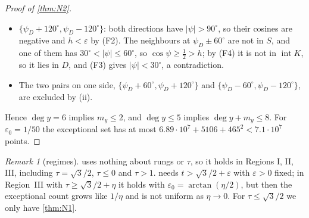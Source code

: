 \documentclass[11pt]{amsart}
\theoremstyle{definition}
\theoremstyle{remark}
\newtheorem{remark}[theorem]{Remark}
\newcommand{\eps}{\varepsilon}
\begin{document}
\begin{proof}[Proof of \cref{thm:N2}]
\begin{enumerate}[label=(\roman*),leftmargin=2em,resume]
\begin{itemize}[leftmargin=1.5em]
\item $\{\psi_D+120^\circ,\psi_D-120^\circ\}$: both directions have $|\psi|>90^\circ$, so their cosines are negative and $h<\eps$ by (F2). The neighbours at $\psi_D\pm60^\circ$ are not in $S$, and one of them has $30^\circ<|\psi|\le60^\circ$, so $\cos\psi\ge\frac12>h$; by (F4) it is not in $\operatorname{int}K$, so it lies in $D$, and (F3) gives $|\psi|<30^\circ$, a contradiction.
\item The two pairs on one side, $\{\psi_D+60^\circ,\psi_D+120^\circ\}$ and $\{\psi_D-60^\circ,\psi_D-120^\circ\}$, are excluded by (ii).
\end{itemize}
\end{enumerate}
Hence $\deg y=6$ implies $m_y\le2$, and $\deg y\le5$ implies $\deg y+m_y\le8$. For $\eps_0=1/50$ the exceptional set has at most $6.89\cdot10^7+5106+465^2<7.1\cdot10^7$ points.
\end{proof}

\begin{remark}[regimes]
 uses nothing about rungs or $\tau$, so it holds in Regions I, II, III, including $\tau=\sqrt3/2$, $\tau\le0$ and $\tau>1$.  needs $t>\sqrt3/2+\eps$ with $\eps>0$ fixed; in Region~III with $\tau\ge\sqrt3/2+\eta$ it holds with $\eps_0=\arctan(\eta/2)$, but then the exceptional count grows like $1/\eta$ and is not uniform as $\eta\to0$. For $\tau\le\sqrt3/2$ we only have \cref{thm:N1}.
\end{remark}
\end{document}
